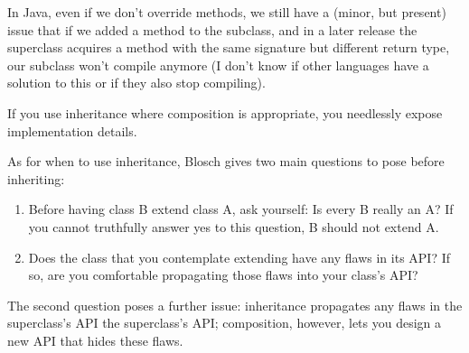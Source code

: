 \documentclass{article}
\begin{document}
In Java, even if we don't override methods, we still have a (minor, but
present) issue that if we added a method to the subclass, and in a later
release the superclass acquires a method with the same signature but
different return type, our subclass won't compile anymore (I don't know if
other languages have a solution to this or if they also stop compiling).






If you use inheritance where composition is appropriate, you needlessly
expose implementation details.

As for when to use inheritance, Blosch gives two main questions to pose
before inheriting:
\begin{enumerate}
  \item Before having class B extend class A, ask yourself: Is every B really
  an A? If you cannot truthfully answer yes to this question, B should not
  extend A.
  \item Does the class that you contemplate extending have any flaws in its
  API? If so, are you comfortable propagating those flaws into your class's
  API?
\end{enumerate}
The second question poses a further issue: inheritance propagates any flaws
in the superclass's API the superclass's API; composition, however, lets you
design a new API that hides these flaws.
\end{document}
